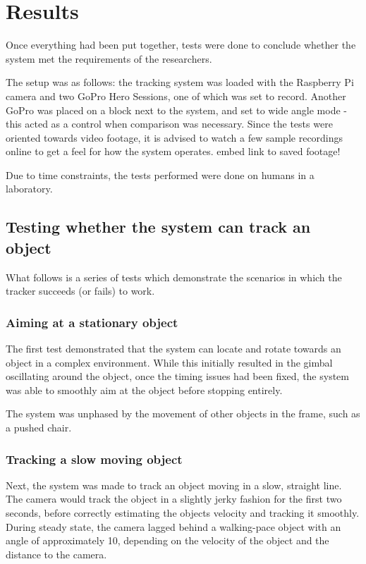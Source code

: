 \chapter{Results}\label{chap:results}

Once everything had been put together, tests were done to conclude whether the system met the requirements of the researchers.

The setup was as follows: the tracking system was loaded with the Raspberry Pi camera and two GoPro Hero Sessions, one of which was set to record. Another GoPro was placed on a block next to the system, and set to wide angle mode - this acted as a control when comparison was necessary. Since the tests were oriented towards video footage, it is advised to watch a few sample recordings online to get a feel for how the system operates. {\color{red} embed link to saved footage!}

Due to time constraints, the tests performed were done on humans in a laboratory.

\section{Testing whether the system can track an object}
What follows is a series of tests which demonstrate the scenarios in which the tracker succeeds (or fails) to work.

\subsection{Aiming at a stationary object}
The first test demonstrated that the system can locate and rotate towards an object in a complex environment. While this initially resulted in the gimbal oscillating around the object, once the timing issues had been fixed, the system was able to smoothly aim at the object before stopping entirely.

The system was unphased by the movement of other objects in the frame, such as a pushed chair.


\subsection{Tracking a slow moving object}
Next, the system was made to track an object moving in a slow, straight line. The camera would track the object in a slightly jerky fashion for the first two seconds, before correctly estimating the objects velocity and tracking it smoothly. During steady state, the camera lagged behind a walking-pace object with an angle of approximately 10\textdegree, depending on the velocity of the object and the distance to the camera.

